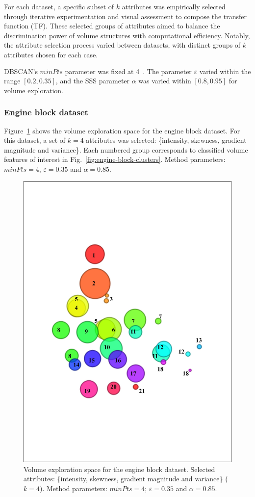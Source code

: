 For each dataset, a specific subset of \(k\) attributes was empirically selected through iterative experimentation and visual assessment to compose the transfer function (TF). These selected groups of attributes aimed to balance the discrimination power of volume structures with computational efficiency. Notably, the attribute selection process varied between datasets, with distinct groups of \(k\) attributes chosen for each case.

DBSCAN's $minPts$ parameter was fixed at 4~\cite{ester1996}. The parameter $\varepsilon$ varied within the range $[0.2, 0.35]$, and the SSS parameter $\alpha$ was varied within $[0.8, 0.95]$ for volume exploration.

\subsubsection{Engine block dataset}
\label{subsubsec:engine-block}

Figure~\ref{fig:engine-block-clusters-tf} shows the volume exploration space for the engine block dataset. For this dataset, a set of \(k = 4\) attributes was selected: \{intensity, skewness, gradient magnitude and variance\}. Each numbered group corresponds to classified volume features of interest in Fig.~\ref{fig:engine-block-clusters}. Method parameters: $minPts=4$, $\varepsilon=0.35$ and $\alpha=0.85$.

\begin{figure}[htb!]
    \centering
    \includegraphics[width=0.7\columnwidth]{figs/engine-block-clusters-tf.jpg}
    \caption{Volume exploration space for the engine block dataset. Selected attributes: \{intensity, skewness, gradient magnitude and variance\} (\(k=4\)). Method parameters: $minPts=4$; $\varepsilon=0.35$ and $\alpha=0.85$.}
    \label{fig:engine-block-clusters-tf}
\end{figure}

